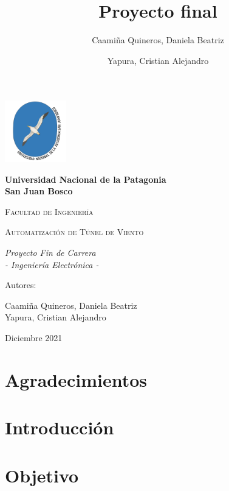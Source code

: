 \documentclass[12pt,a4paper]{article}
\author{Caamiña Quineros, Daniela Beatriz\\ \and Yapura, Cristian Alejandro}
\title{Proyecto final}
\begin{document}

\begin{titlepage}
	\centering
	{\includegraphics[width=0.2\textwidth]{unpsjb.png}\par}
	\vspace{1cm}
	{\bfseries\LARGE Universidad Nacional de la Patagonia\\ San Juan Bosco \par}
	\vspace{1cm}
	{\scshape\Large Facultad de Ingenier\'ia \par}
	\vspace{3cm}
	{\scshape\Huge Automatización de Túnel de Viento \par}
	\vspace{3cm}
	{\itshape\Large Proyecto Fin de Carrera\\ - Ingeniería Electrónica - \par}
	\vfill
	{\Large Autores: \par}
	{\Large Caamiña Quineros, Daniela Beatriz\\ Yapura, Cristian Alejandro \par}
	\vfill
	{\Large Diciembre 2021 \par}
	\end{titlepage}



\newpage


\section*{Agradecimientos}

\newpage

	\tableofcontents
	\newpage
	\listoffigures
	\newpage
	\listoftables
	\newpage


	\section{Introducción}
	


	\section{Objetivo}
	
\end{document}
